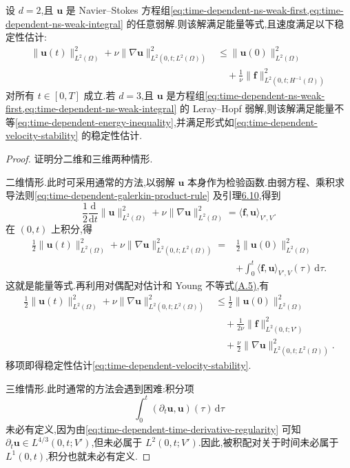 \begin{lemma}[能量不等式与解的稳定性]\label{lem:time-dependent-energy-stability}
设 $d=2$,且 $\bm{u}$ 是 Navier--Stokes 方程组\cref{eq:time-dependent-ns-weak-first,eq:time-dependent-ns-weak-integral} 的任意弱解.则该解满足能量等式,且速度满足以下稳定性估计:
\begin{equation}\label{eq:time-dependent-velocity-stability}
\begin{aligned}
  \|\bm{u}(t)\|_{L^2(\Omega)}^2
  +\nu\|\nabla\bm{u}\|_{L^2(0,t;L^2(\Omega))}^2
  &\le \|\bm{u}(0)\|_{L^2(\Omega)}^2\\
  &\quad+\frac{1}{\nu}\|\bm{f}\|_{L^2(0,t;H^{-1}(\Omega))}^2
\end{aligned}
\end{equation}
对所有 $t\in[0,T]$ 成立.若 $d=3$,且 $\bm{u}$ 是方程组\cref{eq:time-dependent-ns-weak-first,eq:time-dependent-ns-weak-integral} 的 Leray--Hopf 弱解,则该解满足能量不等\cref{eq:time-dependent-energy-inequality},并满足形式如\cref{eq:time-dependent-velocity-stability} 的稳定性估计.
\begin{proof}
证明分二维和三维两种情形.

二维情形.此时可采用通常的方法,以弱解 $\bm{u}$ 本身作为检验函数.由弱方程、乘积求导法则\cref{eq:time-dependent-galerkin-product-rule} 及引理\hyperref[lem:steady-ns-convection-vanishing]{6.10},得到
\[
  \frac{1}{2}\frac{\mathrm{d}}{\mathrm{d}t}
      \|\bm{u}\|_{L^2(\Omega)}^2
  +\nu\|\nabla\bm{u}\|_{L^2(\Omega)}^2
  =\langle\bm{f},\bm{u}\rangle_{V',V}.
\]
在 $(0,t)$ 上积分,得
\[
\begin{aligned}
  \frac{1}{2}\|\bm{u}(t)\|_{L^2(\Omega)}^2
  +\nu\|\nabla\bm{u}\|_{L^2(0,t;L^2(\Omega))}^2
  ={}&\frac{1}{2}\|\bm{u}(0)\|_{L^2(\Omega)}^2\\
     &+\int_0^t\langle\bm{f},\bm{u}\rangle_{V',V}(\tau)
                  \,\mathrm{d}\tau.
\end{aligned}
\]
这就是能量等式.再利用对偶配对估计和 Young 不等式\hyperref[eq:appendix-a-5]{(A.5)},有
\[
\begin{aligned}
  \frac{1}{2}\|\bm{u}(t)\|_{L^2(\Omega)}^2
  +\nu\|\nabla\bm{u}\|_{L^2(0,t;L^2(\Omega))}^2
  &\le \frac{1}{2}\|\bm{u}(0)\|_{L^2(\Omega)}^2\\
  &\quad+\frac{1}{2\nu}\|\bm{f}\|_{L^2(0,t;V')}^2\\
  &\quad+\frac{\nu}{2}
      \|\nabla\bm{u}\|_{L^2(0,t;L^2(\Omega))}^2.
\end{aligned}
\]
移项即得稳定性估计\cref{eq:time-dependent-velocity-stability}.

三维情形.此时通常的方法会遇到困难:积分项
\[
  \int_0^t(\partial_t\bm{u},\bm{u})(\tau)\,\mathrm{d}\tau
\]
未必有定义,因为由\cref{eq:time-dependent-time-derivative-regularity} 可知
$\partial_t\bm{u}\in L^{4/3}(0,t;V')$,但未必属于 $L^2(0,t;V')$.因此,被积配对关于时间未必属于 $L^1(0,t)$,积分也就未必有定义.


\end{proof}
\end{lemma}
